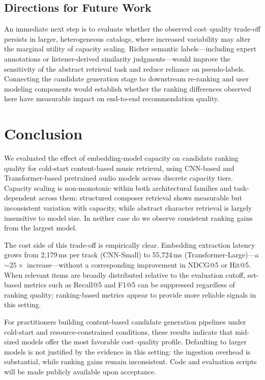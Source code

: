 \documentclass[sigconf]{acmart}
\begin{document}
\subsection{Directions for Future Work}

An immediate next step is to evaluate whether the observed cost--quality trade-off persists in larger, heterogeneous catalogs, where increased variability may alter the marginal utility of capacity scaling. Richer semantic labels---including expert annotations or listener-derived similarity judgments---would improve the sensitivity of the abstract retrieval task and reduce reliance on pseudo-labels. Connecting the candidate generation stage to downstream re-ranking and user modeling components would establish whether the ranking differences observed here have measurable impact on end-to-end recommendation quality.

\section{Conclusion}

We evaluated the effect of embedding-model capacity on candidate ranking quality for cold-start content-based music retrieval, using CNN-based and Transformer-based pretrained audio models across discrete capacity tiers. Capacity scaling is non-monotonic within both architectural families and task-dependent across them: structured composer retrieval shows measurable but inconsistent variation with capacity, while abstract character retrieval is largely insensitive to model size. In neither case do we observe consistent ranking gains from the largest model.

The cost side of this trade-off is empirically clear. Embedding extraction latency grows from 2{,}179\,ms per track (CNN-Small) to 55{,}724\,ms (Transformer-Large)---a ${\sim}25{\times}$ increase---without a corresponding improvement in NDCG@5 or Hit@5. When relevant items are broadly distributed relative to the evaluation cutoff, set-based metrics such as Recall@5 and F1@5 can be suppressed regardless of ranking quality; ranking-based metrics appear to provide more reliable signals in this setting.

For practitioners building content-based candidate generation pipelines under cold-start and resource-constrained conditions, these results indicate that mid-sized models offer the most favorable cost--quality profile. Defaulting to larger models is not justified by the evidence in this setting: the ingestion overhead is substantial, while ranking gains remain inconsistent. Code and evaluation scripts will be made publicly available upon acceptance.


\end{document}
